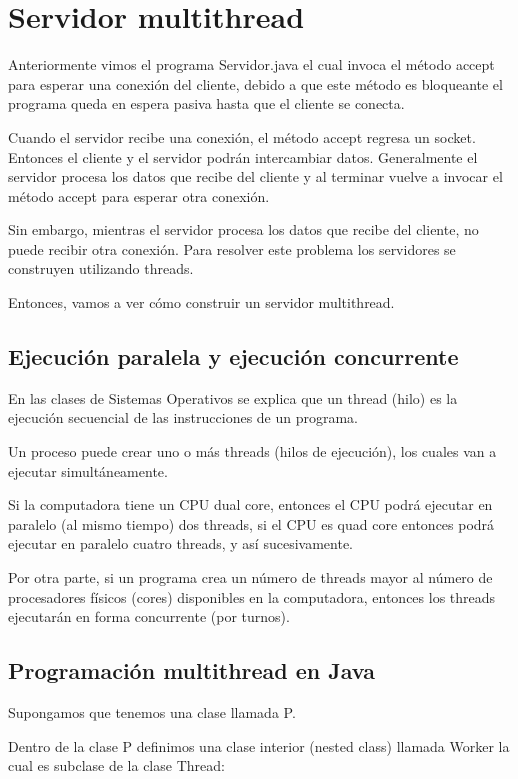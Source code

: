 \chapter{Servidor multithread}

Anteriormente vimos el programa Servidor.java el cual invoca el método accept para esperar una conexión del cliente, debido a que este método es bloqueante el programa queda en espera pasiva hasta que el cliente se conecta.

Cuando el servidor recibe una conexión, el método accept regresa un socket. Entonces el cliente y el servidor podrán intercambiar datos. Generalmente el servidor procesa los datos que recibe del cliente y al terminar vuelve a invocar el método accept para esperar otra conexión.

Sin embargo, mientras el servidor procesa los datos que recibe del cliente, no puede recibir otra conexión. Para resolver este problema los servidores se construyen utilizando threads.

Entonces, vamos a ver cómo construir un servidor multithread.

\section{Ejecución paralela y ejecución concurrente}

En las clases de Sistemas Operativos se explica que un thread (hilo) es la ejecución secuencial de las instrucciones de un programa.

Un proceso puede crear uno o más threads (hilos de ejecución), los cuales van a ejecutar simultáneamente.

Si la computadora tiene un CPU dual core, entonces el CPU podrá ejecutar en paralelo (al mismo tiempo) dos threads, si el CPU es quad core entonces podrá ejecutar en paralelo cuatro threads, y así sucesivamente.

Por otra parte, si un programa crea un número de threads mayor al número de procesadores físicos (cores) disponibles en la computadora, entonces los threads ejecutarán en forma concurrente (por turnos).

\section{Programación multithread en Java}

Supongamos que tenemos una clase llamada P.

Dentro de la clase P definimos una clase interior (nested class) llamada Worker la cual es subclase de la clase Thread:

